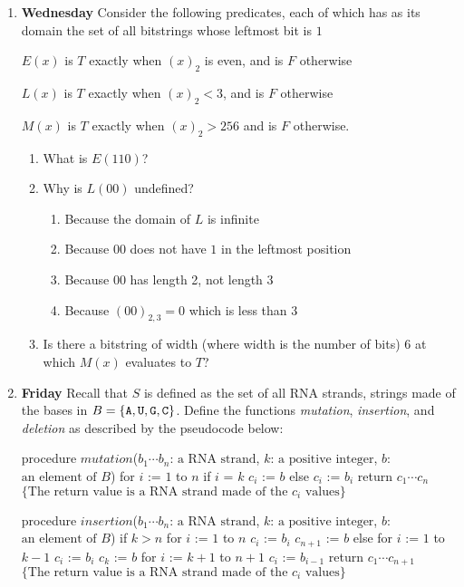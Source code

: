 \documentclass[12pt, oneside]{article}
\begin{document}
\begin{enumerate}
\item {\bf Wednesday} Consider the following predicates, each of which has 
as its domain the set of all bitstrings whose leftmost bit is $1$

$E(x)$ is $T$ exactly when $(x)_{2}$ is even, and is $F$ otherwise

$L(x)$ is $T$ exactly when $(x)_2 < 3$, and is $F$ otherwise

$M(x)$ is $T$ exactly when $(x)_2 > 256$ and is $F$ otherwise.

\begin{enumerate}
\item What is $E(110)$?
\item Why is $L( 00)$ undefined?
\begin{enumerate}
\item Because the domain of $L$ is infinite
\item Because $00$ does not have $1$ in the leftmost position
\item Because $00$ has length 2, not length 3
\item Because $(00)_{2,3} = 0$ which is less than $3$
\end{enumerate}
\item Is there a bitstring of width (where width is the number of bits) $6$ at which $M(x)$ evaluates 
to $T$?
\end{enumerate}

\newpage
\item {\bf Friday} Recall that $S$ is defined as the set of all RNA strands, strings made of the bases in 
 $B = \{\texttt{A},\texttt{U},\texttt{G},\texttt{C}\}$. Define the functions \textit{mutation}, \textit{insertion}, and \textit{deletion} as described by the pseudocode below:

\begin{algorithm}
procedure $\textit{mutation}$($b_1\cdots b_n$: $\textrm{a RNA strand}$, $k$: $\textrm{a  positive integer}$, $b$: $\textrm{an  element of } B$)
for $i$ := $1$ to $n$
  if $i$ = $k$
    $c_i$ := $b$
  else
    $c_i$ := $b_i$
return $c_1\cdots c_n$ $\{ \textrm{The return value is a RNA strand made of the } c_i \textrm{ values}\}$
\end{algorithm}

\begin{algorithm}
procedure $\textit{insertion}$($b_1\cdots b_n$: $\textrm{a RNA strand}$, $k$: $\textrm{a  positive integer}$, $b$: $\textrm{an  element of } B$)
if $k > n$
  for $i$ := $1$ to $n$
    $c_i$ := $b_i$
  $c_{n+1}$ := $b$
else 
  for $i$ := $1$ to $k-1$
    $c_i$ := $b_i$
  $c_k$ := $b$
  for $i$ := $k+1$ to $n+1$
    $c_i$ := $b_{i-1}$
return $c_1\cdots c_{n+1}$ $\{ \textrm{The return value is a RNA strand made of the } c_i \textrm{ values}\}$
\end{algorithm}


\end{enumerate}
\end{document}
